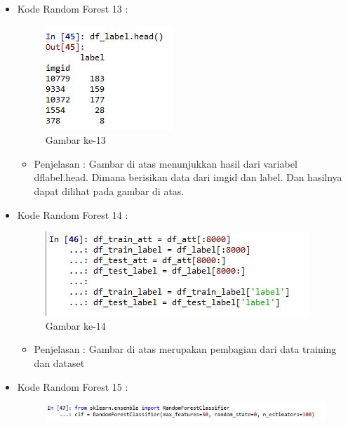 \begin{enumerate}
\begin{itemize}
\begin{itemize}
\begin{itemize}
\begin{itemize}
\par
\par
\end{itemize}
\item Kode Random Forest 13 :
\par
\begin{figure}[ht]
\centering
\includegraphics[scale=0.7]{figures/hmm/cod13.jpg}
\caption{Gambar ke-13}
\label{contoh}
\end{figure}
\par
\begin{itemize}
\item Penjelasan : Gambar di atas menunjukkan hasil dari variabel dflabel.head. Dimana berisikan data dari imgid dan label. Dan hasilnya dapat dilihat pada gambar di atas.
\par
\par
\end{itemize}
\item Kode Random Forest 14 :
\par
\begin{figure}[ht]
\centering
\includegraphics[scale=0.7]{figures/hmm/cod14.jpg}
\caption{Gambar ke-14}
\label{contoh}
\end{figure}
\par
\begin{itemize}
\item Penjelasan : Gambar di atas merupakan pembagian dari data training dan dataset
\par
\par
\end{itemize}
\item Kode Random Forest 15 :
\par
\begin{figure}[ht] 
\centering
\includegraphics[scale=0.7]{figures/hmm/cod15.jpg}

\end{figure}
\end{itemize}
\end{itemize}
\end{itemize}
\end{enumerate}
